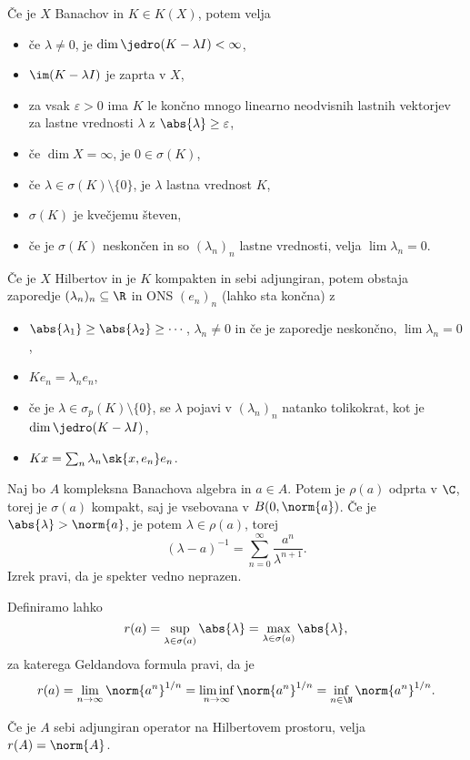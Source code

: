 Če je $X$ Banachov in $K \in K(X)$, potem velja
\begin{itemize}
\item če $\lambda \ne 0$, je $\dim \jedro(K - \lambda I) < \infty$,
\item $\im (K - \lambda I)$ je zaprta v $X$,
\item za vsak $\varepsilon > 0$ ima $K$ le končno mnogo linearno neodvisnih
  lastnih vektorjev za lastne vrednosti $\lambda$ z $\abs{\lambda} \ge
  \varepsilon$,
\item če $\dim X = \infty$, je $0 \in \sigma(K)$,
\item če $\lambda \in \sigma(K) \setminus \{0\}$, je $\lambda$ lastna vrednost
  $K$,
\item $\sigma(K)$ je kvečjemu števen,
\item če je $\sigma(K)$ neskončen in so $(\lambda_n)_n$ lastne vrednosti, velja
  $\lim \lambda_n = 0$.
\end{itemize}

Če je $X$ Hilbertov in je $K$ kompakten in sebi adjungiran, potem obstaja
zaporedje $(\lambda_n)_n \subseteq \R$ in ONS $(e_n)_n$ (lahko sta končna) z
\begin{itemize}
\item $\abs{\lambda_1} \ge \abs{\lambda_2} \ge \cdots$, $\lambda_n \ne 0$ in če
  je zaporedje neskončno, $\lim \lambda_n = 0$,
\item $K e_n = \lambda_n e_n$,
\item če je $\lambda \in \sigma_p(K) \setminus \{0\}$, se $\lambda$ pojavi v
  $(\lambda_n)_n$ natanko tolikokrat, kot je $\dim \jedro (K - \lambda I)$,
\item $Kx = \sum_n \lambda_n \sk{x, e_n} e_n$.
\end{itemize}


Naj bo $A$ kompleksna Banachova algebra in $a \in A$.
Potem je $\rho(a)$ odprta v $\C$, torej je $\sigma(a)$ kompakt, saj je vsebovana
v $B(0, \norm{a})$.
Če je $\abs{\lambda} > \norm{a}$, je potem $\lambda \in \rho(a)$, torej
\[
  (\lambda - a)^{-1} = \sum_{n=0}^\infty \frac{a^n}{\lambda^{n+1}}.
\]
Izrek pravi, da je spekter vedno neprazen.

Definiramo lahko 
\[
  r(a) = \sup_{\lambda \in \sigma(a)} \abs{\lambda} = \max_{\lambda \in
	\sigma(a)} \abs{\lambda},
\]
za katerega Geldandova formula pravi, da je
\[
  r(a) = \lim_{n \to \infty} \norm{a^n}^{1/n}
  = \liminf_{n \to \infty} \norm{a^n}^{1/n}
  = \inf_{n \in \N} \norm{a^n}^{1/n}.
\]

Če je $A$ sebi adjungiran operator na Hilbertovem prostoru, velja $r(A) =
\norm{A}$.

